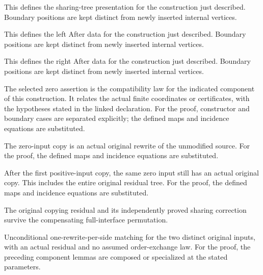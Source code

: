 This defines the sharing-tree presentation for the construction just described. Boundary positions are kept distinct from newly inserted internal vertices.
\par{}

This defines the left After data for the construction just described. Boundary positions are kept distinct from newly inserted internal vertices.
\par{}

This defines the right After data for the construction just described. Boundary positions are kept distinct from newly inserted internal vertices.
\par{}

The selected zero assertion is the compatibility law for the indicated component of this construction. It relates the actual finite coordinates or certificates, with the hypotheses stated in the linked declaration.
For the proof, constructor and boundary cases are separated explicitly; the defined maps and incidence equations are substituted.
\par{}

The zero-input copy is an actual original rewrite of the unmodified source.
For the proof, the defined maps and incidence equations are substituted.
\par{}

After the first positive-input copy, the same zero input still has an actual original copy. This includes the entire original residual tree.
For the proof, the defined maps and incidence equations are substituted.
\par{}

The original copying residual and its independently proved sharing correction survive the compensating full-interface permutation.
\par{}

Unconditional one-rewrite-per-side matching for the two distinct original inputs, with an actual residual and no assumed order-exchange law.
For the proof, the preceding component lemmas are composed or specialized at the stated parameters.
\par{}

